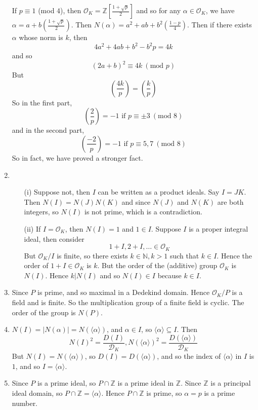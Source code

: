 \begin{enumerate}
    If $p \equiv 1$ (mod $4$), then $\mathcal{O}_K=\mathbb{Z}[\frac{1+\sqrt{p}}{2}]$ and so
    for any $\alpha \in \mathcal{O}_K$, we have $\alpha=a+b(\frac{1+\sqrt{p}}{2})$. Then
    $N(\alpha)=a^2+ab+b^2(\frac{1-p}{4})$. Then if there exists $\alpha$ whose norm is $k$, then
    $$4a^2+4ab+b^2-b^2p=4k$$ and so
    $$(2a+b)^2 \equiv 4k~(\text{mod }p)$$
    But
    $$\left(\frac{4k}{p}\right)=\left(\frac{k}{p}\right)$$
    So in the first part,
    $$\left(\frac{2}{p}\right)=-1 \text{ if } p \equiv \pm 3~(\text{mod } 8)$$
    and in the second part,
    $$\left(\frac{-2}{p}\right)=-1 \text{ if } p \equiv 5,7~(\text{mod } 8)$$
    So in fact, we have proved a stronger fact.
\item \begin{enumerate}
    \item[(i)] Suppose not, then $I$ can be written as a product ideals. Say $I=JK$.
    Then $N(I)=N(J)N(K)$ and since $N(J)$ and $N(K)$ are both integers, so $N(I)$ is not prime, which is a
    contradiction.\\
    \item[(ii)] If $I=\mathcal{O}_K$, then $N(I)=1$ and $1 \in I$. Suppose $I$ is a proper integral ideal, then
    consider
    $$1+I,2+I,\ldots \in \mathcal{O}_K$$
    But $\mathcal{O}_K/I$ is finite, so there exists $k \in \mathbb{N}, k >1$ such that
    $k \in I$. Hence the order of $1+I \in \mathcal{O}_K$ is $k$. But the order of the (additive) group
    $\mathcal{O}_K$ is $N(I)$. Hence $k|N(I)$ and so $N(I) \in I$ because $k \in I$.
    \end{enumerate}
\item Since $P$ is prime, and so maximal in a Dedekind domain. Hence $\mathcal{O}_K/P$ is a field and is finite. So the multiplication group of a finite field is cyclic. The order of the group is $N(P)$.
\item $N(I)=|N(\alpha)|=N(\langle \alpha \rangle)$, and $\alpha \in I$, so $\langle \alpha \rangle \subseteq I$.
    Then
   $$N(I)^2=\frac{D(I)}{\mathcal{D}_K},N(\langle \alpha \rangle)^2=
    \frac{D(\langle \alpha \rangle)}{\mathcal{D}_K}$$
   But $N(I)=N(\langle \alpha \rangle)$, so $D(I)=D(\langle \alpha \rangle)$, and so the index of
   $\langle \alpha \rangle$ in $I$ is $1$, and so $I=\langle \alpha \rangle$.
\item Since $P$ is a prime ideal, so $P \cap \mathbb{Z}$ is a prime ideal in $\mathbb{Z}$. Since $\mathbb{Z}$ is
   a principal ideal domain, so $P \cap \mathbb{Z}=\langle \alpha \rangle$. Hence $P \cap \mathbb{Z}$ is prime, so
   $\alpha=p$ is a prime number.

\end{enumerate}
